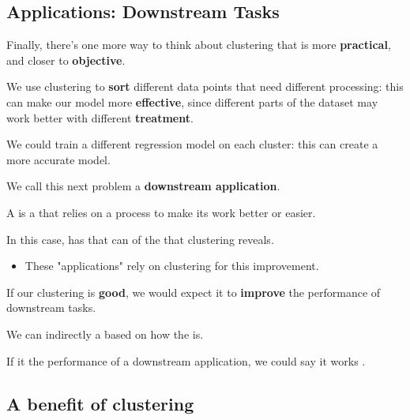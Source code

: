     \subsection{Applications: Downstream Tasks}
    
        Finally, there's one more way to think about clustering that is more \textbf{practical}, and closer to \textbf{objective}.
        
        We use clustering to \textbf{sort} different data points that need different processing: this can make our model more \textbf{effective}, since different parts of the dataset may work better with different \textbf{treatment}.
        
        \miniex We could train a different regression model on each cluster: this can create a more accurate model.
        
        We call this next problem a \textbf{downstream application}.\\
        
        \begin{definition}
            A  is a  that relies on a  process to make its work better or easier.
            
            In this case,  has  that can  of the  that clustering reveals.

            \begin{itemize}
                \item These "applications" rely on clustering for this improvement.
            \end{itemize}
        \end{definition}
        
        If our clustering is \textbf{good}, we would expect it to \textbf{improve} the performance of downstream tasks.\\
        
        \begin{concept}
            We can indirectly  a  based on how  the  is.
            
            If it  the performance of a downstream application, we could say it works .
        \end{concept}
        
    \subsection{A benefit of clustering}
    
